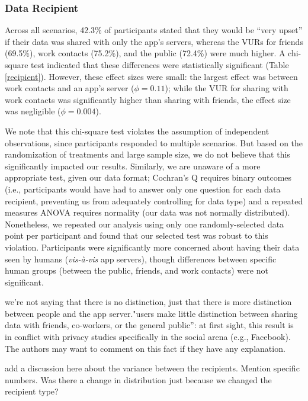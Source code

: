 
\subsubsection{Data Recipient}
Across all scenarios, 42.3\% of participants stated that they would be ``very upset'' if their data was shared with only the app's servers, whereas the VURs for friends (69.5\%), work contacts (75.2\%), and the public (72.4\%) were much higher. A chi-square test indicated that these differences were statistically significant (Table \ref{recipient}). However, these effect sizes were small: the largest effect was between work contacts and an app's server ($\phi=0.11$); while the VUR for sharing with work contacts was significantly higher than sharing with friends, the effect size was negligible ($\phi=0.004$). 

We note that this chi-square test violates the assumption of independent observations, since participants responded to multiple scenarios. But based on the randomization of treatments and large sample size, we do not believe that this significantly impacted our results. Similarly, we are unaware of a more appropriate test, given our data format; Cochran's Q requires binary outcomes (i.e., participants would have had to answer only one question for each data recipient, preventing us from adequately controlling for data type) and a repeated measures ANOVA requires normality (our data was not normally distributed). Nonetheless, we repeated our analysis using only one randomly-selected data point per participant and found that our selected test was robust to this violation. Participants were significantly more concerned about having their data seen by humans ({\it vis-{\`a}-vis} app servers), though differences between specific human groups (between the public, friends, and work contacts) were not significant.

{\color {red} we're not saying that there is no distinction, just that there is more distinction between people and the app server."users make little distinction between sharing data with friends, co-workers, or the general public”: at first sight, this result is in conflict with privacy studies specifically in the social arena (e.g., Facebook). The authors may want to comment on this fact if they have any explanation.}

{\color {red} add a discussion here about the variance between the recipients. Mention specific numbers. Was there a change in distribution just because we changed the recipient type?}